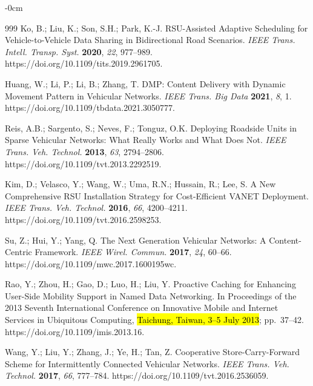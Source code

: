 \documentclass[electronics,aricle,accept,pdftex,moreauthors]{Definitions/mdpi}
\begin{document}
\begin{adjustwidth}{-\extralength}{0cm}
\begin{thebibliography}{999}
Ko, B.; Liu, K.; Son, S.H.; Park, K.-J. RSU-Assisted Adaptive Scheduling for Vehicle-to-Vehicle Data Sharing in Bidirectional Road Scenarios. \emph{IEEE Trans. Intell. Transp. Syst.} \textbf{2020}, \emph{22}, 977–989. https://doi.org/10.1109/tits.2019.2961705.

Huang, W.; Li, P.; Li, B.; Zhang, T. DMP: Content Delivery with Dynamic Movement Pattern in Vehicular Networks. \emph{IEEE Trans. Big Data} \textbf{2021}, \emph{8}, 1. https://doi.org/10.1109/tbdata.2021.3050777.

Reis, A.B.; Sargento, S.; Neves, F.; Tonguz, O.K. Deploying Roadside Units in Sparse Vehicular Networks: What Really Works and What Does Not. \emph{IEEE Trans. Veh. Technol.} \textbf{2013}, \emph{63}, 2794–2806. https://doi.org/10.1109/tvt.2013.2292519.

Kim, D.; Velasco, Y.; Wang, W.; Uma, R.N.; Hussain, R.; Lee, S. A New Comprehensive RSU Installation Strategy for Cost-Efficient VANET Deployment. \emph{IEEE Trans. Veh. Technol.} \textbf{2016}, \emph{66}, 4200--4211. https://doi.org/10.1109/tvt.2016.2598253.

Su, Z.; Hui, Y.; Yang, Q. The Next Generation Vehicular Networks: A Content-Centric Framework. \emph{IEEE Wirel. Commun.} \textbf{2017}, \emph{24}, 60–66. https://doi.org/10.1109/mwc.2017.1600195wc.

Rao, Y.; Zhou, H.; Gao, D.; Luo, H.; Liu, Y. Proactive Caching for Enhancing User-Side Mobility Support in Named Data Networking. In Proceedings of the 2013 Seventh International Conference on Innovative Mobile and Internet Services in Ubiquitous Computing, \hl{Taichung, Taiwan, 3--5 July 2013}; pp.~37–42. https://doi.org/10.1109/imis.2013.16.

Wang, Y.; Liu, Y.; Zhang, J.; Ye, H.; Tan, Z. Cooperative Store-Carry-Forward Scheme for Intermittently Connected Vehicular Networks. \emph{IEEE Trans. Veh. Technol.} \textbf{2017}, \emph{66}, 777--784. https://doi.org/10.1109/tvt.2016.2536059.


\end{thebibliography}
\end{adjustwidth}
\end{document}
